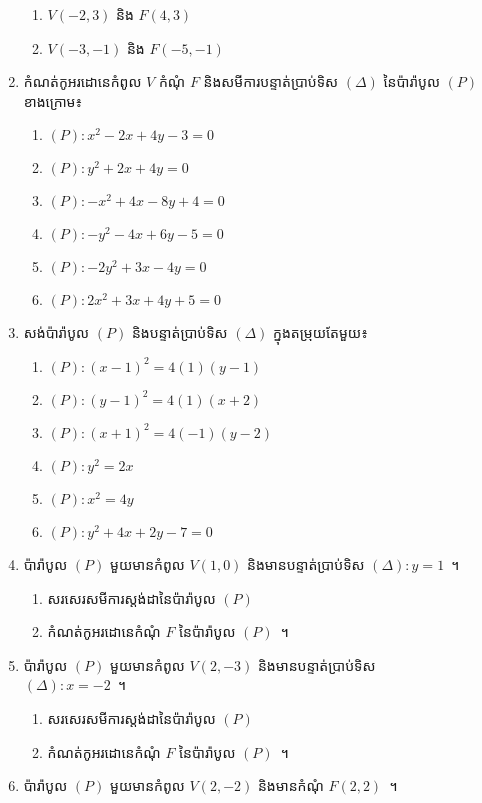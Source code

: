 \begin{enumerate}
\begin{enumerate}[2]
		\item $ V(-2,3) $ និង $ F(4,3) $
		\item $ V(-3,-1) $ និង $ F(-5,-1) $
	\end{enumerate}
	\item កំណត់កូអរដោនេកំពូល $ V $ កំណុំ $ F $ និងសមីការបន្ទាត់ប្រាប់ទិស $ (\Delta) $ នៃប៉ារ៉ាបូល $ (P) $ ខាងក្រោម៖
	\begin{enumerate}[2]
		\item $ (P):x^2-2x+4y-3=0 $
		\item $ (P):y^2+2x+4y=0 $
		\item $ (P):-x^2+4x-8y+4=0 $
		\item $ (P):-y^2-4x+6y-5=0 $
		\item $ (P):-2y^2+3x-4y=0 $
		\item $ (P):2x^2+3x+4y+5=0 $
	\end{enumerate}
	\item សង់ប៉ារ៉ាបូល $ (P) $ និងបន្ទាត់ប្រាប់ទិស $ (\Delta) $ ក្នុងតម្រុយតែមួយ៖
	\begin{enumerate}[2]
		\item $ (P):(x-1)^2=4(1)(y-1) $
		\item $ (P):(y-1)^2=4(1)(x+2) $
		\item $ (P):(x+1)^2=4(-1)(y-2) $
		\item $ (P):y^2=2x $
		\item $ (P):x^2=4y $
		\item $ (P):y^2+4x+2y-7=0 $
	\end{enumerate}
	\item ប៉ារ៉ាបូល $ (P) $ មួយមានកំពូល $ V(1,0) $ និងមានបន្ទាត់ប្រាប់ទិស $ (\Delta): y=1 $~។
	\begin{enumerate}
		\item សរសេរសមីការស្តង់ដានៃប៉ារ៉ាបូល $ (P) $
		\item កំណត់កូអរដោនេកំណុំ $ F $ នៃប៉ារ៉ាបូល $ (P) $~។
	\end{enumerate}
	\item ប៉ារ៉ាបូល $ (P) $ មួយមានកំពូល $ V(2,-3) $ និងមានបន្ទាត់ប្រាប់ទិស\\ $ (\Delta): x=-2 $~។
	\begin{enumerate}
		\item សរសេរសមីការស្តង់ដានៃប៉ារ៉ាបូល $ (P) $
		\item កំណត់កូអរដោនេកំណុំ $ F $ នៃប៉ារ៉ាបូល $ (P) $~។
	\end{enumerate}
	\item ប៉ារ៉ាបូល $ (P) $ មួយមានកំពូល $ V(2,-2) $ និងមានកំណុំ $ F(2,2) $~។
	\begin{enumerate}

\end{enumerate}
\end{enumerate}
